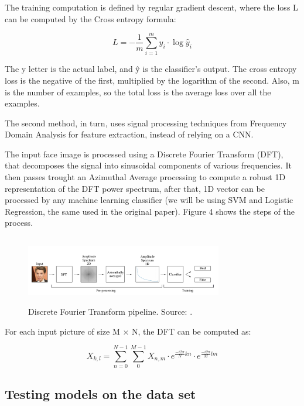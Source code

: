 \documentclass{bmvc2k}
\begin{document}
The training computation is defined by regular gradient descent, where the loss L can be computed by the Cross entropy formula:

\begin{equation}\label{eq:2}
 L = - \frac{1}{m} \sum_{i=1}^{m} y_i \cdot \log{\hat{y}_i}
\end{equation}

The y letter is the actual label, and ŷ is the classifier’s output. The cross entropy loss is the negative of the first, multiplied by the logarithm of the second. Also, m is the number of examples, so the total loss is the average loss over all the examples.

\hspace{1.5cm}

The second method, in turn, uses signal processing techniques from Frequency Domain Analysis for feature extraction, instead of relying on a CNN. 

The input face image is processed using a Discrete Fourier Transform (DFT), that decomposes the signal into sinusoidal components of various frequencies. It then passes trought an Azimuthal Average processing to compute a robust 1D representation of the DFT power spectrum, after that, 1D vector can be processed by any machine learning classifier (we will be using SVM and Logistic Regression, the same used in the original paper). Figure 4 shows the steps of the process.


\begin{figure}[!h]
\centering
\includegraphics[width=8.6cm, height=3.0cm]{fft-pipeline.png}
    \caption{Discrete Fourier Transform pipeline. Source: \cite{durall2019unmasking}.}
\end{figure}


For each input picture of size M × N, the DFT can be computed as:

\begin{equation}\label{eq:1}
  X_{k,l} = \sum_{n=0}^{N - 1} \sum_{0}^{M- 1} X_{n,m} \cdot e^{\frac{-i2\pi}{ N} kn} \cdot e^{\frac{-i2\pi}{ M} lm}
\end{equation}

\subsection{Testing models on the data set}
\end{document}
